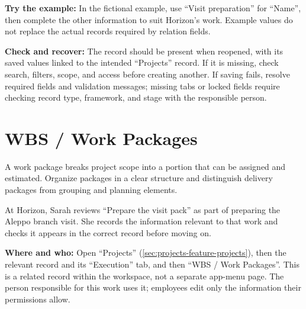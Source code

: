 \textbf{Try the example:} In the fictional example, use “Visit preparation” for “Name”, then complete the other information to suit Horizon's work. Example values do not replace the actual records required by relation fields.

\textbf{Check and recover:} The record should be present when reopened, with its saved values linked to the intended “Projects” record. If it is missing, check search, filters, scope, and access before creating another. If saving fails, resolve required fields and validation messages; missing tabs or locked fields require checking record type, framework, and stage with the responsible person.

\clearpage
\section{WBS / Work Packages}
\label{sec:projects-feature-wbs-items}

A work package breaks project scope into a portion that can be assigned and estimated. Organize packages in a clear structure and distinguish delivery packages from grouping and planning elements.

\begin{rcnote}
At Horizon, Sarah reviews “Prepare the visit pack” as part of preparing the Aleppo branch visit. She records the information relevant to that work and checks it appears in the correct record before moving on.
\end{rcnote}

\textbf{Where and who:} Open “Projects” (\ref{sec:projects-feature-projects}), then the relevant record and its “Execution” tab, and then “WBS / Work Packages”. This is a related record within the workspace, not a separate app-menu page. The person responsible for this work uses it; employees edit only the information their permissions allow.

